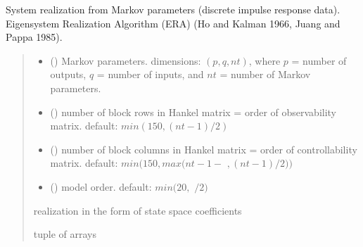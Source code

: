 \documentclass[letterpaper,10pt,english]{sphinxmanual}
\begin{document}
\begin{fulllineitems}
\label{\detokenize{library/mdof.realize:mdof.realize.era}}
\pysigstartsignatures
{}
\pysigstopsignatures
\sphinxAtStartPar
System realization from Markov parameters (discrete impulse response data).
Eigensystem Realization Algorithm (ERA) (Ho and Kalman 1966, Juang and Pappa 1985).
\begin{quote}\begin{description}
\begin{itemize}
\item {} 
\sphinxAtStartPar
{} () \textendash{} Markov parameters. dimensions: \((p,q,nt)\), where \(p\) = number of outputs,
\(q\) = number of inputs, and \(nt\) = number of Markov parameters.

\item {} 
\sphinxAtStartPar
{} (\sphinxstyleliteralemphasis{\sphinxupquote{, }}) \textendash{} number of block rows in Hankel matrix = order of observability matrix.
default: \(min(150, (nt-1)/2)\)

\item {} 
\sphinxAtStartPar
{} (\sphinxstyleliteralemphasis{\sphinxupquote{, }}) \textendash{} number of block columns in Hankel matrix = order of controllability matrix.
default: \(min(150, max(nt-1-\) \(, (nt-1)/2))\)

\item {} 
\sphinxAtStartPar
{} (\sphinxstyleliteralemphasis{\sphinxupquote{, }}) \textendash{} model order. default: \(min(20,\) \(/2)\)

\end{itemize}

\sphinxAtStartPar
realization in the form of state space coefficients 

\sphinxAtStartPar
tuple of arrays

\end{description}\end{quote}

\end{fulllineitems}
\end{document}
